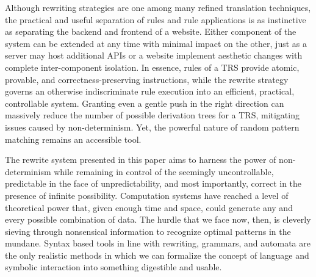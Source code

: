 \documentclass{article}
\begin{document}
Although rewriting strategies are one among many refined translation techniques,
the practical and useful separation of rules and rule applications
is as instinctive as separating the backend and frontend of a website.
Either component of the system can be extended at any time with minimal impact on the other,
just as a server may host additional APIs or a website implement aesthetic changes with complete inter-component isolation.
In essence, rules of a TRS provide atomic, provable, and correctness-preserving instructions,
while the rewrite strategy governs an otherwise indiscriminate rule execution into an efficient, practical, controllable system.
Granting even a gentle push in the right direction can massively reduce the number of possible derivation trees for a TRS,
mitigating issues caused by non-determinism. Yet, the powerful nature of random pattern matching remains an accessible tool.

The rewrite system presented in this paper aims
to harness the power of non-determinism while remaining in control of the seemingly uncontrollable,
predictable in the face of unpredictability, and most importantly, correct in the presence of infinite possibility.
Computation systems have reached a level of theoretical power that, given enough time and space, could generate any and every possible
combination of data. The hurdle that we face now, then, is cleverly sieving through nonsensical information to recognize optimal patterns in the mundane.
Syntax based tools in line with rewriting, grammars, and automata are the only realistic methods in which we can formalize the concept of language and symbolic interaction
into something digestible and usable.

\pagebreak
\nocite{*} %
\printbibliography %
\end{document}
